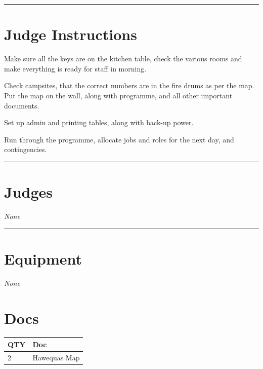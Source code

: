 \documentclass[10pt]{article}
\begin{document}
	\vspace{0.5cm}
	\hrule
	\vspace{0.5cm}

		\section*{Judge Instructions}
		Make sure all the keys are on the kitchen table, check the various rooms and make everything is ready for staff in morning.



Check campsites, that the correct numbers are in the fire drums as per the map. Put the map on the wall, along with programme, and all other important documents.



Set up admin and printing tables, along with back-up power. 



Run through the programme, allocate jobs and roles for the next day, and contingencies.
\vspace{0.5cm}
	\hrule
	\vspace{0.5cm}
		\section*{\faUsers \: Judges}

					\textit{None}
			\vspace{0.5cm}
	\hrule
	\vspace{0.5cm}

	\begin{multicols}{2}

		\section*{\faWrench \: Equipment}

				\textit{None}
		
		\vfill\null
		\columnbreak

			\section*{\faFile \: Docs}
		 	\begin{center}
			\begin{tabular}{p{2cm}p{4cm}}

			\textbf{QTY} & \textbf{Doc} \\\toprule
										2&Hawequas Map\\\midrule
							\end{tabular}
			\end{center}
	

		\vfill\null

		\end{multicols}
\end{document}
